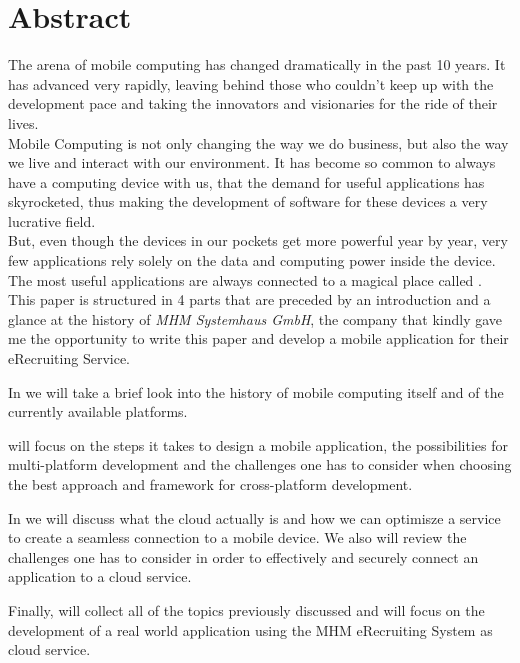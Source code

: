 \begingroup
\let\clearpage\relax
\let\cleardoublepage\relax
\let\cleardoublepage\relax
\vfill
\chapter*{Abstract}
The arena of mobile computing has changed dramatically in the past 10 years. It has advanced very rapidly, leaving behind those who couldn't keep up with the development pace and taking the innovators and visionaries for the ride of their lives.\\
\newline
Mobile Computing is not only changing the way we do business, but also the way we live and interact with our environment. It has become so common to always have a computing device with us, that the demand for useful applications has skyrocketed, thus making the development of software for these devices a very lucrative field.\\
\newline
But,  even though the devices in our pockets get more powerful year by year, very few applications rely solely on the data and computing power inside the device. The most useful applications are always connected to a magical place called .\\
\newline
This paper is structured in 4 parts that are preceded by an introduction and a glance at the history of \emph{MHM Systemhaus GmbH}, the company that kindly gave me the opportunity to write this paper and develop a mobile application for their eRecruiting Service.

In  we will take a brief look into the history of mobile computing itself and of the currently available platforms. 

 will focus on the steps it takes to design a mobile application, the possibilities for multi-platform development and the challenges one has to consider when choosing the best approach and framework for cross-platform development.

In  we will discuss what the cloud actually is and how we can optimisze a service to create a seamless connection to a mobile device. We also will review the challenges one has to consider in order to effectively and securely connect an application to a cloud service.

Finally,  will collect all of the topics previously discussed and will focus on the development of a real world application using the MHM eRecruiting System as cloud service.       


\vfill


\endgroup			

\vfill